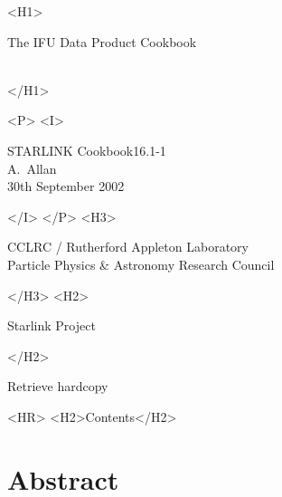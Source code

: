 \documentclass[twoside,11pt]{article}
\newcommand{\stardoccategory}  {STARLINK Cookbook}
\newcommand{\stardocsource}    {sc\stardocnumber}
\newcommand{\stardocnumber}    {16.1-1}
\newcommand{\stardocauthors}   {A.~Allan}
\newcommand{\stardocdate}      {30th September 2002}
\newcommand{\stardoctitle}     {The IFU Data Product Cookbook}
\newcommand{\htmladdnormallink}[2]{#1}
\newcommand{\htmladdimg}[1]{}
\newcommand{\htmlref}[2]{#1}
\newcommand{\htmladdtonavigation}[1]{}
\newcommand{\xlabel}[1]{}
\newcommand{\latexonlytoc}[0]{\tableofcontents}
\begin{document}
\begin{htmlonly}
   \xlabel{}
   \begin{rawhtml} <H1> \end{rawhtml}
      \stardoctitle\\
      \stardocversion\\
      \stardocmanual
   \begin{rawhtml} </H1> \end{rawhtml}

   \htmladdimg{sc16_cover.gif}


   \begin{rawhtml} <P> <I> \end{rawhtml}
   \stardoccategory \stardocnumber \\
   \stardocauthors \\
   \stardocdate
   \begin{rawhtml} </I> </P> <H3> \end{rawhtml}
      \htmladdnormallink{CCLRC}{http://www.cclrc.ac.uk} /
      \htmladdnormallink{Rutherford Appleton Laboratory}
                        {http://www.cclrc.ac.uk/ral} \\
      \htmladdnormallink{Particle Physics \& Astronomy Research Council}
                        {http://www.pparc.ac.uk} \\
   \begin{rawhtml} </H3> <H2> \end{rawhtml}
      \htmladdnormallink{Starlink Project}{http://star-www.rl.ac.uk/}
   \begin{rawhtml} </H2> \end{rawhtml}
   \htmladdnormallink{\htmladdimg{source.gif} Retrieve hardcopy}
      {http://star-www.rl.ac.uk/cgi-bin/hcserver?\stardocsource}\\

  \label{stardoccontents}
  \begin{rawhtml} 
    <HR>
    <H2>Contents</H2>
  \end{rawhtml}
  \renewcommand{\latexonlytoc}[0]{}

  \section{\xlabel{abstract}Abstract}
\end{htmlonly}
\end{document}
